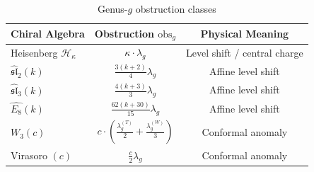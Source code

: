 \begin{table}[ht]
\centering
\caption{Genus-$g$ obstruction classes}
\label{tab:obstruction-summary}
\begin{tabular}{|l|c|c|}
\hline
\textbf{Chiral Algebra} & \textbf{Obstruction $\text{obs}_g$} & \textbf{Physical Meaning} \\
\hline
Heisenberg $\mathcal{H}_\kappa$ & $\kappa \cdot \lambda_g$ & Level shift / central charge \\
\hline
$\widehat{\mathfrak{sl}}_2(k)$ & $\frac{3(k+2)}{4} \lambda_g$ & Affine level shift \\
\hline
$\widehat{\mathfrak{sl}}_3(k)$ & $\frac{4(k+3)}{3} \lambda_g$ & Affine level shift \\
\hline
$\widehat{E_8}(k)$ & $\frac{62(k+30)}{15} \lambda_g$ & Affine level shift \\
\hline
$W_3(c)$ & $c \cdot (\frac{\lambda_g^{(T)}}{2} + \frac{\lambda_g^{(W)}}{3})$ & 
Conformal anomaly \\
\hline
Virasoro $(c)$ & $\frac{c}{2} \lambda_g$ & Conformal anomaly \\
\hline
\end{tabular}
\end{table}

